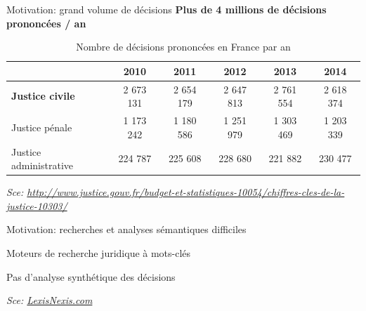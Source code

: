 \documentclass[newPxFont,pagenumber]{beamer}
\begin{document}
\begin{frame}[c]{Motivation: grand volume de décisions}
\textbf{Plus de 4 millions de décisions prononcées / an}
\begin{table}[!htb]
{
\footnotesize
\begin{center}
\begin{tabular}{|p{2cm}|c|c|c|c|c|}
\hline
 & \textbf{2010} & \textbf{2011} & \textbf{2012} & \textbf{2013} & \textbf{2014} \\
 \hline
 \textbf{Justice civile} & 2 673 131  & 2 654 179 & 2 647 813 & 2 761 554  & 2 618 374 \\
 \hline
Justice pénale & 1 173 242 & 1 180 586 & 1 251 979 & 1 303 469 & 1 203 339 \\
 \hline
 Justice administrative & 224 787 & 225 608 & 228 680 & 221 882 & 230 477 \\
 \hline
\end{tabular}

\textit{\tiny{Sce: \url{http://www.justice.gouv.fr/budget-et-statistiques-10054/chiffres-cles-de-la-justice-10303/}}}  
\end{center}
}
\caption{Nombre de décisions prononcées en France par an}\label{decisionstats}
\end{table}
\end{frame}

\begin{frame}[t]{Motivation: recherches et analyses sémantiques difficiles}

Moteurs de recherche juridique à mots-clés 

Pas d'analyse synthétique des décisions 


\textit{\tiny{Sce: \url{LexisNexis.com}}} 
\end{frame}
\end{document}
